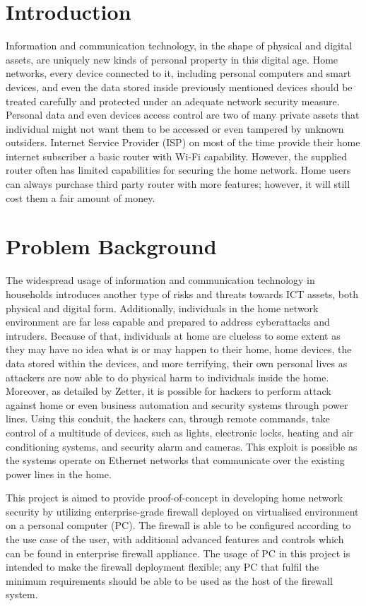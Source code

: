 \documentclass[conference]{IEEEtran}
\begin{document}
\section{Introduction}

Information and communication technology, in the shape of physical and digital assets, are uniquely
new kinds of personal property in this digital age. Home networks, every device connected to it,
including personal computers and smart devices, and even the data stored inside previously mentioned
devices should be treated carefully and protected under an adequate network security measure.
Personal data and even devices access control are two of many private assets that individual might
not want them to be accessed or even tampered by unknown outsiders. Internet Service Provider (ISP)
on most of the time provide their home internet subscriber a basic router with Wi-Fi capability.
However, the supplied router often has limited capabilities for securing the home network. Home
users can always purchase third party router with more features; however, it will still cost them a
fair amount of money.

\section{Problem Background}

The widespread usage of information and communication technology in households introduces another
type of risks and threats towards ICT assets, both physical and digital form. Additionally,
individuals in the home network environment are far less capable and prepared to address
cyberattacks and intruders. Because of that, individuals at home are clueless to some extent as they
may have no idea what is or may happen to their home, home devices, the data stored within the
devices, and more terrifying, their own personal lives as attackers are now able to do physical harm
to individuals inside the home. Moreover, as detailed by Zetter, it is possible for hackers to
perform attack against home or even business automation and security systems through power lines.
Using this conduit, the hackers can, through remote commands, take control of a multitude of
devices, such as lights, electronic locks, heating and air conditioning systems, and security alarm
and cameras. This exploit is possible as the systems operate on Ethernet networks that communicate
over the existing power lines in the home.

This project is aimed to provide proof-of-concept in developing home network security by utilizing
enterprise-grade firewall deployed on virtualised environment on a personal computer (PC). The
firewall is able to be configured according to the use case of the user, with additional advanced
features and controls which can be found in enterprise firewall appliance. The usage of PC in this
project is intended to make the firewall deployment flexible; any PC that fulfil the minimum
requirements should be able to be used as the host of the firewall system.
\end{document}

